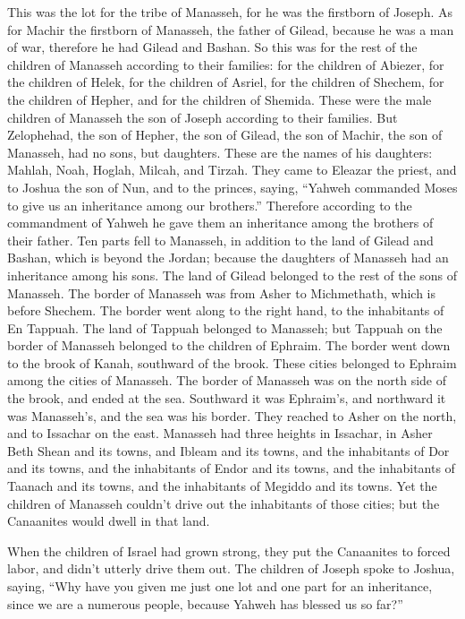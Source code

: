  This was the lot for the tribe of Manasseh, for he was the
firstborn of Joseph. As for Machir the firstborn of Manasseh, the father
of Gilead, because he was a man of war, therefore he had Gilead and
Bashan.  So this was for the rest of the children of
Manasseh according to their families: for the children of Abiezer, for
the children of Helek, for the children of Asriel, for the children of
Shechem, for the children of Hepher, and for the children of Shemida.
These were the male children of Manasseh the son of Joseph according to
their families.  But Zelophehad, the son of Hepher, the son
of Gilead, the son of Machir, the son of Manasseh, had no sons, but
daughters. These are the names of his daughters: Mahlah, Noah, Hoglah,
Milcah, and Tirzah.  They came to Eleazar the priest, and to
Joshua the son of Nun, and to the princes, saying, ``Yahweh commanded
Moses to give us an inheritance among our brothers.'' Therefore
according to the commandment of Yahweh he gave them an inheritance among
the brothers of their father.  Ten parts fell to Manasseh,
in addition to the land of Gilead and Bashan, which is beyond the
Jordan;  because the daughters of Manasseh had an
inheritance among his sons. The land of Gilead belonged to the rest of
the sons of Manasseh.  The border of Manasseh was from Asher
to Michmethath, which is before Shechem. The border went along to the
right hand, to the inhabitants of En Tappuah.  The land of
Tappuah belonged to Manasseh; but Tappuah on the border of Manasseh
belonged to the children of Ephraim.  The border went down
to the brook of Kanah, southward of the brook. These cities belonged to
Ephraim among the cities of Manasseh. The border of Manasseh was on the
north side of the brook, and ended at the sea.  Southward
it was Ephraim's, and northward it was Manasseh's, and the sea was his
border. They reached to Asher on the north, and to Issachar on the east.
 Manasseh had three heights in Issachar, in Asher Beth
Shean and its towns, and Ibleam and its towns, and the inhabitants of
Dor and its towns, and the inhabitants of Endor and its towns, and the
inhabitants of Taanach and its towns, and the inhabitants of Megiddo and
its towns.  Yet the children of Manasseh couldn't drive out
the inhabitants of those cities; but the Canaanites would dwell in that
land.

 When the children of Israel had grown strong, they put the
Canaanites to forced labor, and didn't utterly drive them out.
 The children of Joseph spoke to Joshua, saying, ``Why have
you given me just one lot and one part for an inheritance, since we are
a numerous people, because Yahweh has blessed us so far?''

